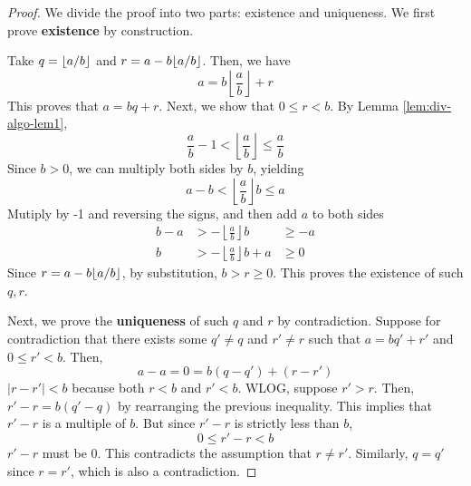 \begin{proof}
    We divide the proof into two parts: existence and uniqueness. We first prove \textbf{existence} by construction.

    Take $q = \lfloor a/b\rfloor$ and $r = a - b \lfloor a/b\rfloor$. Then, we have
    $$
    a = b \left\lfloor \frac{a}{b} \right\rfloor + r
    $$
    This proves that $a = bq + r$. Next, we show that $0 \leq r < b$. By Lemma \ref{lem:div-algo-lem1}, 
    $$
    \frac{a}{b} - 1 < \left\lfloor \frac{a}{b} \right\rfloor \leq \frac{a}{b}
    $$
    Since $b > 0$, we can multiply both sides by $b$, yielding
    $$
    a - b < \left\lfloor \frac{a}{b} \right\rfloor b \leq a
    $$
    Mutiply by -1 and reversing the signs, and then add $a$ to both sides
    $$
    \begin{aligned}
        b - a &> - \left\lfloor \frac{a}{b} \right\rfloor b &\geq -a \\
        b &> - \left\lfloor \frac{a}{b} \right\rfloor b + a &\geq 0
    \end{aligned}
    $$
    Since $r = a - b \lfloor a/b\rfloor$, by substitution, $b > r \geq 0$. This proves the existence of such $q,r$.

    Next, we prove the \textbf{uniqueness} of such $q$ and $r$ by contradiction. Suppose for contradiction that there exists some $q' \neq q$ and $r' \neq r$ such that $a = bq' + r'$ and $0 \leq r' < b$. Then,
    $$
    a - a = 0 = b(q - q') + (r - r')
    $$
    $|r - r'| < b$ because both $r < b$ and $r' < b$. WLOG, suppose $r' > r$. Then, $r' - r = b(q' - q)$ by rearranging the previous inequality. This implies that $r' - r$ is a multiple of $b$. But since $r' - r$ is strictly less than $b$,
    $$
    0 \leq r' - r < b
    $$
    $r'-r$ must be 0. This contradicts the assumption that $r \neq r'$. Similarly, $q = q'$ since $r = r'$, which is also a contradiction.
\end{proof}